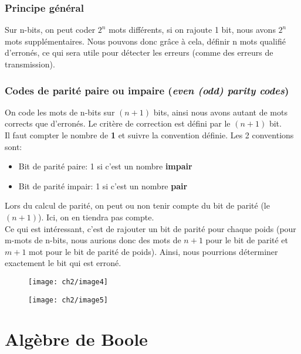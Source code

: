 \subsubsection{Principe général}
Sur n-bits, on peut coder $2^n$ mots différents, si on rajoute 1 bit, nous avons $2^n$ mots supplémentaires. Nous pouvons donc grâce à cela, définir n mots qualifié d'erronés, ce qui sera utile pour détecter les erreurs (comme des erreurs de transmission).
\subsubsection{Codes de parité paire ou impaire (\textit{even (odd) parity codes})}
On code les mots de n-bits sur $(n+1)$ bits, ainsi nous avons autant de mots corrects que d'erronés. Le critère de correction est défini par le $(n+1)$ bit.\\

Il faut compter le nombre de \textbf{1} et suivre la convention définie. Les 2 conventions sont: 
\begin{itemize}
	\item Bit de parité paire: 1 si c'est un nombre \textbf{impair}
	\item Bit de parité impair: 1 si c'est un nombre \textbf{pair}
\end{itemize}
Lors du calcul de parité, on peut ou non tenir compte du bit de parité (le $(n+1)$). Ici, on en tiendra pas compte.\\

Ce qui est intéressant, c'est de rajouter un bit de parité pour chaque poids (pour m-mots de n-bits, nous aurions donc des mots de $n+1$ pour le bit de parité et $m+1$ mot pour le bit de parité de poids). Ainsi, nous pourrions déterminer exactement le bit qui est erroné.
\begin{figure}[H]

	\begin{minipage}{0.55\textwidth}
	\texttt{[image: ch2/image4]}
	\end{minipage}
	\begin{minipage}{0.5\textwidth}
		\texttt{[image: ch2/image5]}
	\end{minipage}
\end{figure}

\section{Algèbre de Boole}
